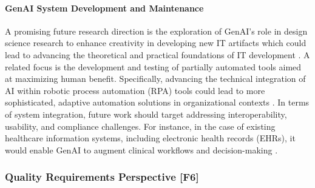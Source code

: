 \paragraph{GenAI System Development and Maintenance}
A promising future research direction is the exploration of GenAI's role in design science research to enhance creativity in developing new IT artifacts which could lead to advancing the theoretical and practical foundations of IT development \parencite{R04}.
A related focus is the development and testing of partially automated tools aimed at maximizing human benefit. Specifically, advancing the technical integration of AI within robotic process automation (RPA) tools could lead to more sophisticated, adaptive automation solutions in organizational contexts \parencite{R05}.
In terms of system integration, future work should target addressing interoperability, usability, and compliance challenges. For instance, in the case of existing healthcare information systems, including electronic health records (EHRs), it would enable GenAI to augment clinical workflows and decision-making \parencite{S11}.


\subsubsection{Quality Requirements Perspective [F6]}

